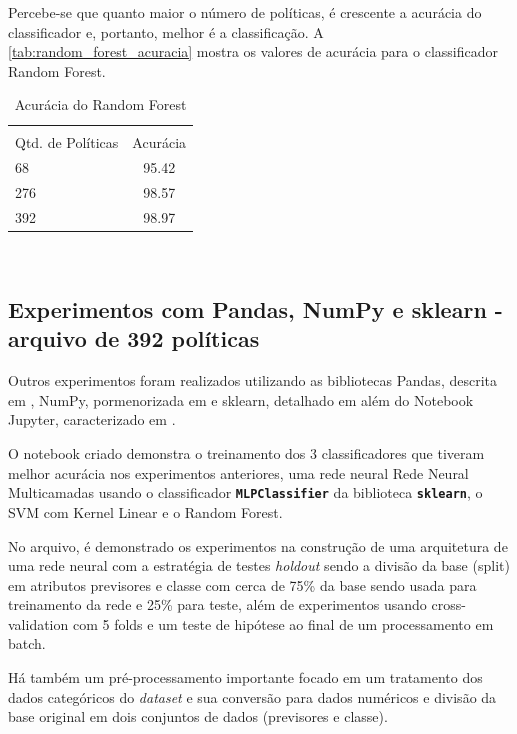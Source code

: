 Percebe-se que quanto maior o número de políticas, é crescente a acurácia do classificador e, portanto, melhor é a classificação. A \autoref{tab:random_forest_acuracia} mostra os valores de acurácia para o classificador Random Forest.

\begin{table}[h!]
	\centering
	\caption{Acurácia do Random Forest}
	\label{tab:random_forest_acuracia}
	\vspace{0.3cm}
	\begin{tabular}{p{6cm}c}
		\hline\\
		Qtd. de Políticas	& Acurácia  \\[10pt] 
		\hline
		68 					& 95.42    	\\
		276		     		& 98.57     \\
		392					& 98.97		\\
		\hline
	\end{tabular}
	\\[6pt]		
\end{table}

\subsection{Experimentos com Pandas, NumPy e sklearn  - arquivo de 392 políticas}\label{exp:pandas-numpy-sklearn}
Outros experimentos foram realizados utilizando as bibliotecas Pandas, descrita em , NumPy, pormenorizada em  e sklearn, detalhado em  além do Notebook Jupyter, caracterizado em . 

O notebook criado demonstra o treinamento dos 3 classificadores que tiveram melhor acurácia nos experimentos anteriores, uma rede neural Rede Neural Multicamadas usando o classificador \texttt{\textbf{MLPClassifier}} da biblioteca \texttt{\textbf{sklearn}}, o SVM com Kernel Linear e o Random Forest.

No arquivo, é demonstrado os experimentos na construção de uma arquitetura de uma rede neural com a estratégia de testes \textit{holdout} sendo a divisão da base (split) em atributos previsores e classe com cerca de 75\% da base sendo usada para treinamento da rede e 25\% para teste, além de experimentos usando cross-validation com 5 folds e um teste de hipótese ao final de um processamento em batch.

Há também um pré-processamento importante focado em um tratamento dos dados categóricos do \textit{dataset} e sua conversão para dados numéricos e divisão da base original em dois conjuntos de dados (previsores e classe).

